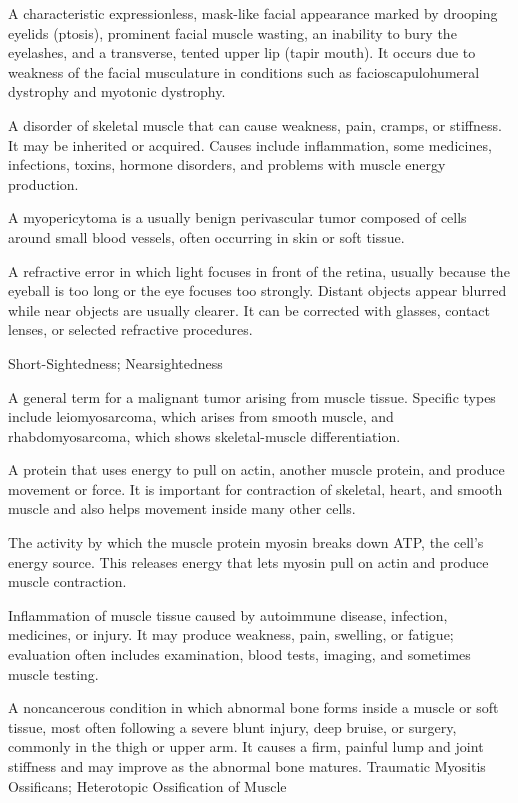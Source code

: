  A characteristic expressionless, mask-like facial appearance marked by drooping eyelids (ptosis), prominent facial muscle wasting, an inability to bury the eyelashes, and a transverse, tented upper lip (tapir mouth). It occurs due to weakness of the facial musculature in conditions such as facioscapulohumeral dystrophy and myotonic dystrophy.

 A disorder of skeletal muscle that can cause weakness, pain, cramps, or stiffness. It may be inherited or acquired. Causes include inflammation, some medicines, infections, toxins, hormone disorders, and problems with muscle energy production.

 A myopericytoma is a usually benign perivascular tumor composed of cells around small blood vessels, often occurring in skin or soft tissue.

 A refractive error in which light focuses in front of the retina, usually because the eyeball is too long or the eye focuses too strongly. Distant objects appear blurred while near objects are usually clearer. It can be corrected with glasses, contact lenses, or selected refractive procedures.

\synonyms
Short-Sightedness; Nearsightedness

 A general term for a malignant tumor arising from muscle tissue. Specific types include leiomyosarcoma, which arises from smooth muscle, and rhabdomyosarcoma, which shows skeletal-muscle differentiation.

 A protein that uses energy to pull on actin, another muscle protein, and produce movement or force. It is important for contraction of skeletal, heart, and smooth muscle and also helps movement inside many other cells.

 The activity by which the muscle protein myosin breaks down ATP, the cell’s energy source. This releases energy that lets myosin pull on actin and produce muscle contraction.

 Inflammation of muscle tissue caused by autoimmune disease, infection, medicines, or injury. It may produce weakness, pain, swelling, or fatigue; evaluation often includes examination, blood tests, imaging, and sometimes muscle testing.

 A noncancerous condition in which abnormal bone forms inside a muscle or soft tissue, most often following a severe blunt injury, deep bruise, or surgery, commonly in the thigh or upper arm. It causes a firm, painful lump and joint stiffness and may improve as the abnormal bone matures.
\synonyms Traumatic Myositis Ossificans; Heterotopic Ossification of Muscle

